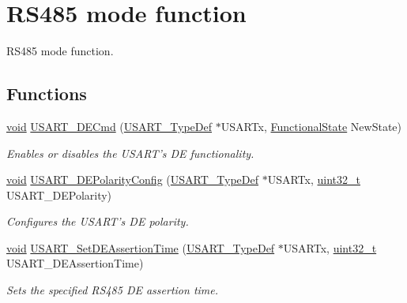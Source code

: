 \hypertarget{group___u_s_a_r_t___group10}{\section{R\-S485 mode function}
\label{group___u_s_a_r_t___group10}
}


R\-S485 mode function.  


\subsection*{Functions}
\begin{DoxyCompactItemize}
\item 
\hyperlink{group___n_a_m_e_ga18028b8badbf1ea7e704ccac3c488e82}{void} \hyperlink{group___u_s_a_r_t___group10_ga7ed44ad239af61683c02fb19a1ea653e}{U\-S\-A\-R\-T\-\_\-\-D\-E\-Cmd} (\hyperlink{struct_u_s_a_r_t___type_def}{U\-S\-A\-R\-T\-\_\-\-Type\-Def} $\ast$U\-S\-A\-R\-Tx, \hyperlink{group___exported__types_gac9a7e9a35d2513ec15c3b537aaa4fba1}{Functional\-State} New\-State)
\begin{DoxyCompactList}\small\item\em Enables or disables the U\-S\-A\-R\-T's D\-E functionality. \end{DoxyCompactList}\item 
\hyperlink{group___n_a_m_e_ga18028b8badbf1ea7e704ccac3c488e82}{void} \hyperlink{group___u_s_a_r_t___group10_ga0597b35c59709c5d467e0a726acdec9f}{U\-S\-A\-R\-T\-\_\-\-D\-E\-Polarity\-Config} (\hyperlink{struct_u_s_a_r_t___type_def}{U\-S\-A\-R\-T\-\_\-\-Type\-Def} $\ast$U\-S\-A\-R\-Tx, \hyperlink{stdint_8h_a435d1572bf3f880d55459d9805097f62}{uint32\-\_\-t} U\-S\-A\-R\-T\-\_\-\-D\-E\-Polarity)
\begin{DoxyCompactList}\small\item\em Configures the U\-S\-A\-R\-T's D\-E polarity. \end{DoxyCompactList}\item 
\hyperlink{group___n_a_m_e_ga18028b8badbf1ea7e704ccac3c488e82}{void} \hyperlink{group___u_s_a_r_t___group10_gab9cbccb1d435ba9efd24867393565d03}{U\-S\-A\-R\-T\-\_\-\-Set\-D\-E\-Assertion\-Time} (\hyperlink{struct_u_s_a_r_t___type_def}{U\-S\-A\-R\-T\-\_\-\-Type\-Def} $\ast$U\-S\-A\-R\-Tx, \hyperlink{stdint_8h_a435d1572bf3f880d55459d9805097f62}{uint32\-\_\-t} U\-S\-A\-R\-T\-\_\-\-D\-E\-Assertion\-Time)
\begin{DoxyCompactList}\small\item\em Sets the specified R\-S485 D\-E assertion time. \end{DoxyCompactList}\item 

\end{DoxyCompactItemize}
